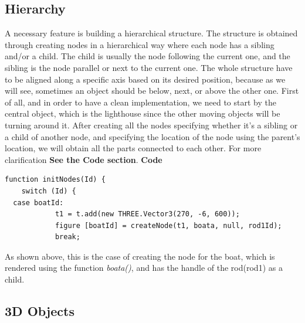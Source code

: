 \documentclass[paper=a4, fontsize=11pt]{scrartcl} %
\numberwithin{equation}{section} %
\numberwithin{figure}{section} %
\numberwithin{table}{section} %
\begin{document}
\newpage

\subsection{Hierarchy}

A necessary feature is building a hierarchical structure. The structure is obtained through creating nodes in a hierarchical way where each node has a sibling and/or a child. The child is usually the node following the current one, and the sibling is the node parallel or next to the current one. The whole structure have to be aligned along a specific axis based on its desired position, because as we will see, sometimes an object should be below, next, or above the other one. First of all, and in order to have a clean implementation, we need to start by the central object, which is the lighthouse since the other moving objects will be turning around it. After creating all the nodes specifying whether it's a sibling or a child of another node, and specifying the location of the node using the parent's location, we will obtain all the parts connected to each other. For more clarification \textbf{See the Code section}.
\newpage
\textbf{Code}

\begin{verbatim}
function initNodes(Id) {
    switch (Id) {
  case boatId:
            t1 = t.add(new THREE.Vector3(270, -6, 600));
            figure [boatId] = createNode(t1, boata, null, rod1Id);
            break;
\end{verbatim}

As shown above, this is the case of creating the node for the boat, which is rendered using the function \textit{boata()}, and has the handle of the rod(rod1) as a child.
\subsection{3D Objects}
\end{document}
